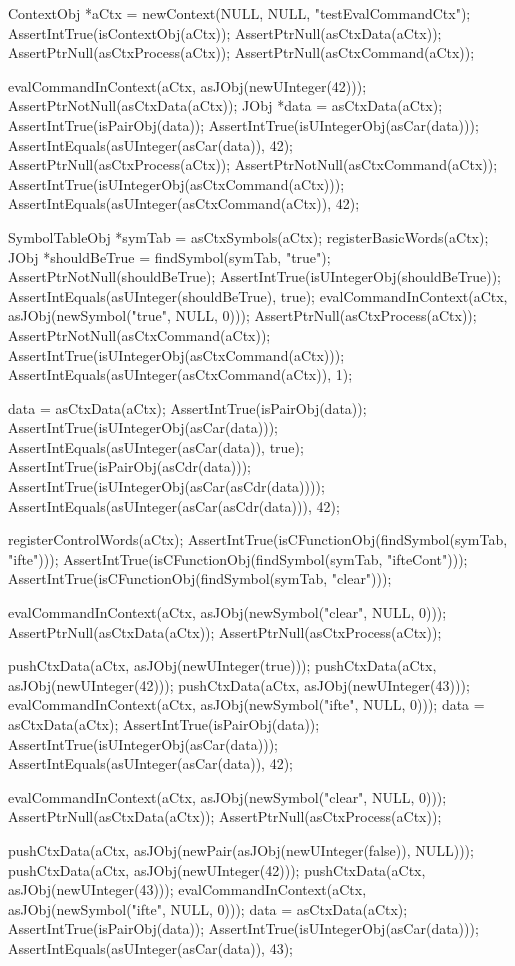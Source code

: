 \startCTest
  ContextObj *aCtx = newContext(NULL, NULL, "testEvalCommandCtx");
  AssertIntTrue(isContextObj(aCtx));
  AssertPtrNull(asCtxData(aCtx));
  AssertPtrNull(asCtxProcess(aCtx));
  AssertPtrNull(asCtxCommand(aCtx));
  
  evalCommandInContext(aCtx, asJObj(newUInteger(42)));
  AssertPtrNotNull(asCtxData(aCtx));
  JObj *data = asCtxData(aCtx);
  AssertIntTrue(isPairObj(data));
  AssertIntTrue(isUIntegerObj(asCar(data)));
  AssertIntEquals(asUInteger(asCar(data)), 42);
  AssertPtrNull(asCtxProcess(aCtx));
  AssertPtrNotNull(asCtxCommand(aCtx));
  AssertIntTrue(isUIntegerObj(asCtxCommand(aCtx)));
  AssertIntEquals(asUInteger(asCtxCommand(aCtx)), 42);
  
  SymbolTableObj *symTab = asCtxSymbols(aCtx);
  registerBasicWords(aCtx);
  JObj *shouldBeTrue = findSymbol(symTab, "true");
  AssertPtrNotNull(shouldBeTrue);
  AssertIntTrue(isUIntegerObj(shouldBeTrue));
  AssertIntEquals(asUInteger(shouldBeTrue), true);
  evalCommandInContext(aCtx, asJObj(newSymbol("true", NULL, 0)));
  AssertPtrNull(asCtxProcess(aCtx));
  AssertPtrNotNull(asCtxCommand(aCtx));
  AssertIntTrue(isUIntegerObj(asCtxCommand(aCtx)));
  AssertIntEquals(asUInteger(asCtxCommand(aCtx)), 1);
  
  data = asCtxData(aCtx);
  AssertIntTrue(isPairObj(data));
  AssertIntTrue(isUIntegerObj(asCar(data)));
  AssertIntEquals(asUInteger(asCar(data)), true);
  AssertIntTrue(isPairObj(asCdr(data)));
  AssertIntTrue(isUIntegerObj(asCar(asCdr(data))));
  AssertIntEquals(asUInteger(asCar(asCdr(data))), 42);
    
  registerControlWords(aCtx);
  AssertIntTrue(isCFunctionObj(findSymbol(symTab, "ifte")));
  AssertIntTrue(isCFunctionObj(findSymbol(symTab, "ifteCont")));
  AssertIntTrue(isCFunctionObj(findSymbol(symTab, "clear")));
  
  evalCommandInContext(aCtx, asJObj(newSymbol("clear", NULL, 0)));
  AssertPtrNull(asCtxData(aCtx));
  AssertPtrNull(asCtxProcess(aCtx));
  
  pushCtxData(aCtx, asJObj(newUInteger(true)));
  pushCtxData(aCtx, asJObj(newUInteger(42)));
  pushCtxData(aCtx, asJObj(newUInteger(43)));
  evalCommandInContext(aCtx, asJObj(newSymbol("ifte", NULL, 0)));
  data = asCtxData(aCtx);
  AssertIntTrue(isPairObj(data));
  AssertIntTrue(isUIntegerObj(asCar(data)));
  AssertIntEquals(asUInteger(asCar(data)), 42);
  
  evalCommandInContext(aCtx, asJObj(newSymbol("clear", NULL, 0)));
  AssertPtrNull(asCtxData(aCtx));
  AssertPtrNull(asCtxProcess(aCtx));
  
  pushCtxData(aCtx, asJObj(newPair(asJObj(newUInteger(false)), NULL)));
  pushCtxData(aCtx, asJObj(newUInteger(42)));
  pushCtxData(aCtx, asJObj(newUInteger(43)));
  evalCommandInContext(aCtx, asJObj(newSymbol("ifte", NULL, 0)));
  data = asCtxData(aCtx);
  AssertIntTrue(isPairObj(data));
  AssertIntTrue(isUIntegerObj(asCar(data)));
  AssertIntEquals(asUInteger(asCar(data)), 43);
\stopCTest

\stopTestCase
\stopTestSuite
